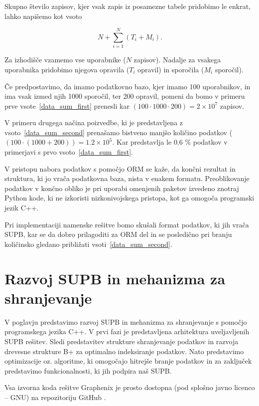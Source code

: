 \documentclass[a4paper,12pt,openright]{book}
\begin{document}
    \noindent
    Skupno število zapisov, kjer vsak zapis iz posamezne tabele pridobimo le enkrat, lahko napišemo kot vsoto

    \begin{equation}
        N + \sum_{i=1}^{N} (T_i + M_i).
    \label{data_sum_second}
    \end{equation}

    \noindent
    Za izhodišče vzamemo vse uporabnike ($N$ zapisov). Nadalje za vsakega uporabnika pridobimo njegova opravila ($T_i$ opravil) in sporočila ($M_i$ sporočil).
    
    Če predpostavimo, da imamo podatkovno bazo, kjer imamo \num{100} uporabnikov, in ima vsak izmed njih \num{1000} sporočil, ter \num{200} opravil, pomeni da bomo v primeru prve vsote~\eqref{data_sum_first} prenesli kar $(100 \cdot 1000 \cdot 200) = 2 \times 10^7$ zapisov.

    V primeru drugega načina poizvedbe, ki je predstavljena z vsoto~\eqref{data_sum_second} prenašamo bistveno manjšo količino podatkov ($(100 \cdot (1000 + 200)) = 1.2 \times 10^5$. Kar predstavlja le $0.6$ \% podatkov v primerjavi s prvo vsoto~\eqref{data_sum_first}.

    V pristopu nabora podatkov s pomočjo ORM se kaže, da končni rezultat in struktura, ki jo vrača podatkovna baza, nista v enakem formatu. Preoblikovanje podatkov v končno obliko je pri uporabi omenjenih paketov izvedeno znotraj Python kode, ki ne izkoristi nizkonivojskega pristopa, kot ga omogoča programski jezik C++.

    Pri implementaciji namenske rešitve bomo skušali format podatkov, ki jih vrača SUPB, kar se da dobro prilagoditi za ORM del in se posledično pri branju količinsko gledano približati vsoti~\eqref{data_sum_second}.

\chapter{Razvoj SUPB in mehanizma za shranjevanje}
\label{ch0}
    V poglavju predstavimo razvoj SUPB in mehanizma za shranjevanje s pomo\-čjo programskega jezika C++. V prvi fazi je predstavljena arhitektura uveljavljenih SUPB rešitev. Sledi predstavitev strukture shranjevanje podatkov in razvoja drevesne strukture B+ za optimalno indeksiranje podatkov. Nato predstavimo optimizacije oz. algoritme, ki omogočajo hitrejše branje podatkov in za zaključek predstavimo funkcionalnosti, ki jih podpira naš SUPB.

    Vsa izvorna koda rešitve Graphenix je prosto dostopna (pod splošno javno licenco – GNU) na repozitoriju GitHub \cite{GRAPHENIX_GITHUB}.
\end{document}
